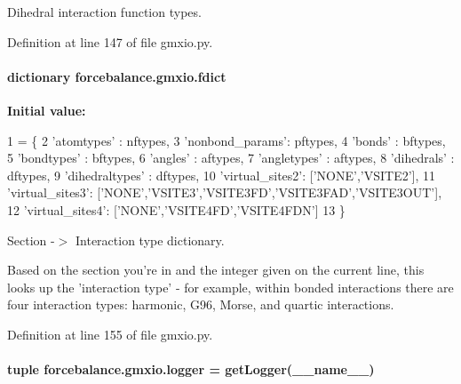 Dihedral interaction function types. 



Definition at line 147 of file gmxio.\-py.

\hypertarget{namespaceforcebalance_1_1gmxio_a179cbde2e55b4c025af89b225612d6e1}{
\paragraph[{fdict}]{\setlength{\rightskip}{0pt plus 5cm}dictionary forcebalance.\-gmxio.\-fdict}}\label{namespaceforcebalance_1_1gmxio_a179cbde2e55b4c025af89b225612d6e1}
{\bfseries Initial value\-:}
\begin{DoxyCode}
1 = \{
2     \textcolor{stringliteral}{'atomtypes'}     : nftypes,
3     \textcolor{stringliteral}{'nonbond\_params'}: pftypes,
4     \textcolor{stringliteral}{'bonds'}         : bftypes,
5     \textcolor{stringliteral}{'bondtypes'}     : bftypes,
6     \textcolor{stringliteral}{'angles'}        : aftypes,
7     \textcolor{stringliteral}{'angletypes'}    : aftypes,
8     \textcolor{stringliteral}{'dihedrals'}     : dftypes,
9     \textcolor{stringliteral}{'dihedraltypes'} : dftypes,
10     \textcolor{stringliteral}{'virtual\_sites2'}: [\textcolor{stringliteral}{'NONE'},\textcolor{stringliteral}{'VSITE2'}],
11     \textcolor{stringliteral}{'virtual\_sites3'}: [\textcolor{stringliteral}{'NONE'},\textcolor{stringliteral}{'VSITE3'},\textcolor{stringliteral}{'VSITE3FD'},\textcolor{stringliteral}{'VSITE3FAD'},\textcolor{stringliteral}{'VSITE3OUT'}],
12     \textcolor{stringliteral}{'virtual\_sites4'}: [\textcolor{stringliteral}{'NONE'},\textcolor{stringliteral}{'VSITE4FD'},\textcolor{stringliteral}{'VSITE4FDN'}]
13     \}
\end{DoxyCode}


Section -\/$>$ Interaction type dictionary. 

Based on the section you're in and the integer given on the current line, this looks up the 'interaction type' -\/ for example, within bonded interactions there are four interaction types\-: harmonic, G96, Morse, and quartic interactions. 

Definition at line 155 of file gmxio.\-py.

\hypertarget{namespaceforcebalance_1_1gmxio_ac10457054444ca04e0a265665afc2512}{
\paragraph[{logger}]{\setlength{\rightskip}{0pt plus 5cm}tuple forcebalance.\-gmxio.\-logger = get\-Logger(\-\_\-\-\_\-name\-\_\-\-\_\-)}}\label{namespaceforcebalance_1_1gmxio_ac10457054444ca04e0a265665afc2512}


